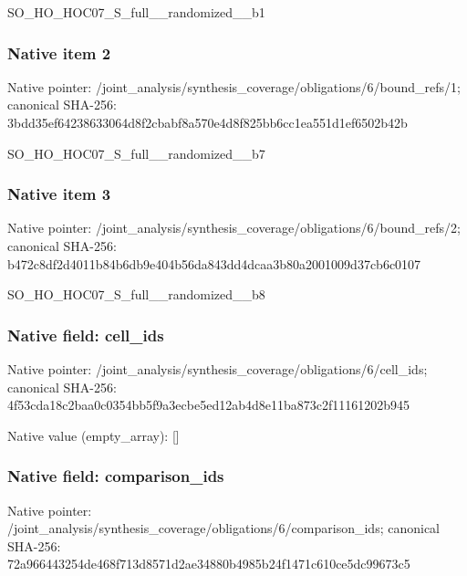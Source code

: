 \documentclass[10pt,a4paper]{article}
\begin{document}
\begingroup\raggedright\sloppy SO\_\allowbreak{}HO\_\allowbreak{}HOC07\_\allowbreak{}S\_\allowbreak{}full\_\allowbreak{}\_\allowbreak{}randomized\_\allowbreak{}\_\allowbreak{}b1\par\endgroup

\subsubsection{Native item 2}
Native pointer: /joint\_\allowbreak{}analysis/synthesis\_\allowbreak{}coverage/obligations/6/bound\_\allowbreak{}refs/1; canonical SHA-256: 3bdd35ef64238633064d8f2cbabf8a570e4d8f825bb6cc1ea551d1ef6502b42b

\begingroup\raggedright\sloppy SO\_\allowbreak{}HO\_\allowbreak{}HOC07\_\allowbreak{}S\_\allowbreak{}full\_\allowbreak{}\_\allowbreak{}randomized\_\allowbreak{}\_\allowbreak{}b7\par\endgroup

\subsubsection{Native item 3}
Native pointer: /joint\_\allowbreak{}analysis/synthesis\_\allowbreak{}coverage/obligations/6/bound\_\allowbreak{}refs/2; canonical SHA-256: b472c8df2d4011b84b6db9e404b56da843dd4dcaa3b80a2001009d37cb6c0107

\begingroup\raggedright\sloppy SO\_\allowbreak{}HO\_\allowbreak{}HOC07\_\allowbreak{}S\_\allowbreak{}full\_\allowbreak{}\_\allowbreak{}randomized\_\allowbreak{}\_\allowbreak{}b8\par\endgroup

\subsubsection{Native field: cell\_\allowbreak{}ids}
Native pointer: /joint\_\allowbreak{}analysis/synthesis\_\allowbreak{}coverage/obligations/6/cell\_\allowbreak{}ids; canonical SHA-256: 4f53cda18c2baa0c0354bb5f9a3ecbe5ed12ab4d8e11ba873c2f11161202b945

Native value (empty\_\allowbreak{}array): []

\subsubsection{Native field: comparison\_\allowbreak{}ids}
Native pointer: /joint\_\allowbreak{}analysis/synthesis\_\allowbreak{}coverage/obligations/6/comparison\_\allowbreak{}ids; canonical SHA-256: 72a966443254de468f713d8571d2ae34880b4985b24f1471c610ce5dc99673c5
\end{document}
